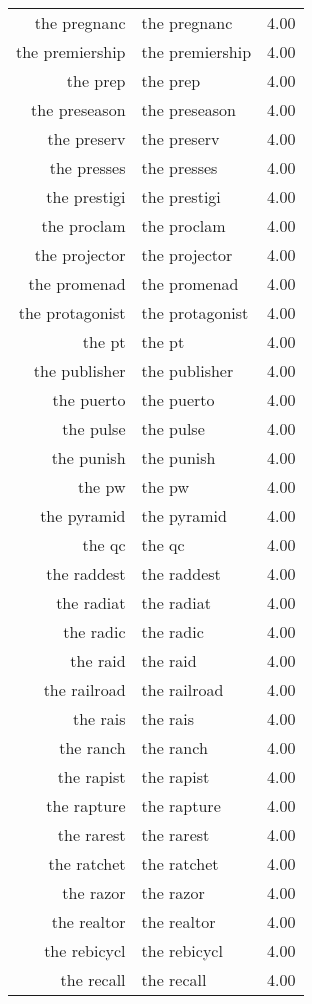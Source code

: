 \begin{table}[ht]
\begin{tabular}{rlr}
  the pregnanc & the pregnanc & 4.00 \\ 
  the premiership & the premiership & 4.00 \\ 
  the prep & the prep & 4.00 \\ 
  the preseason & the preseason & 4.00 \\ 
  the preserv & the preserv & 4.00 \\ 
  the presses & the presses & 4.00 \\ 
  the prestigi & the prestigi & 4.00 \\ 
  the proclam & the proclam & 4.00 \\ 
  the projector & the projector & 4.00 \\ 
  the promenad & the promenad & 4.00 \\ 
  the protagonist & the protagonist & 4.00 \\ 
  the pt & the pt & 4.00 \\ 
  the publisher & the publisher & 4.00 \\ 
  the puerto & the puerto & 4.00 \\ 
  the pulse & the pulse & 4.00 \\ 
  the punish & the punish & 4.00 \\ 
  the pw & the pw & 4.00 \\ 
  the pyramid & the pyramid & 4.00 \\ 
  the qc & the qc & 4.00 \\ 
  the raddest & the raddest & 4.00 \\ 
  the radiat & the radiat & 4.00 \\ 
  the radic & the radic & 4.00 \\ 
  the raid & the raid & 4.00 \\ 
  the railroad & the railroad & 4.00 \\ 
  the rais & the rais & 4.00 \\ 
  the ranch & the ranch & 4.00 \\ 
  the rapist & the rapist & 4.00 \\ 
  the rapture & the rapture & 4.00 \\ 
  the rarest & the rarest & 4.00 \\ 
  the ratchet & the ratchet & 4.00 \\ 
  the razor & the razor & 4.00 \\ 
  the realtor & the realtor & 4.00 \\ 
  the rebicycl & the rebicycl & 4.00 \\ 
  the recall & the recall & 4.00 \\ 

\end{tabular}
\end{table}
